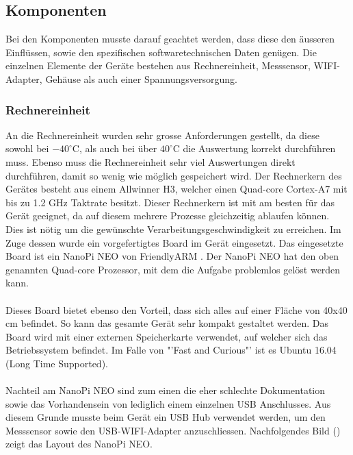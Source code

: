 \subsection{Komponenten}
Bei den Komponenten musste darauf geachtet werden, dass diese den äusseren Einflüssen, sowie den spezifischen softwaretechnischen Daten genügen. Die einzelnen Elemente der Geräte bestehen aus Rechnereinheit, Messsensor, WIFI-Adapter, Gehäuse als auch einer Spannungsversorgung.

\subsubsection{Rechnereinheit}
An die Rechnereinheit wurden sehr grosse Anforderungen gestellt, da diese sowohl bei $-40^\circ\text{C}$, als auch bei über $40^\circ\text{C}$ die Auswertung korrekt durchführen muss. Ebenso muss die Rechnereinheit sehr viel Auswertungen direkt durchführen, damit so wenig wie möglich gespeichert wird. Der Rechnerkern des Gerätes besteht aus einem Allwinner H3, welcher einen Quad-core Cortex-A7 mit bis zu 1.2 GHz Taktrate besitzt. Dieser Rechnerkern ist mit am besten für das Gerät geeignet, da auf diesem mehrere Prozesse gleichzeitig ablaufen können. Dies ist nötig um die gewünschte Verarbeitungsgeschwindigkeit zu erreichen. Im Zuge dessen wurde ein vorgefertigtes Board im Gerät eingesetzt. Das eingesetzte Board ist ein NanoPi NEO von FriendlyARM \cite{NanoPi}. Der NanoPi NEO hat den oben genannten Quad-core Prozessor, mit dem die Aufgabe problemlos gelöst werden kann. \\\\
Dieses Board bietet ebenso den Vorteil, dass sich alles auf einer Fläche von 40x40 cm befindet. So kann das gesamte Gerät sehr kompakt gestaltet werden. Das Board wird mit einer externen Speicherkarte verwendet, auf welcher sich das Betriebssystem befindet. Im Falle von "'Fast and Curious"' ist es Ubuntu 16.04 (Long Time Supported). \\\\
Nachteil am NanoPi NEO sind zum einen die eher schlechte Dokumentation sowie das Vorhandensein von lediglich einem einzelnen USB Anschlusses. Aus diesem Grunde musste beim Gerät ein USB Hub verwendet werden, um den Messsensor sowie den USB-WIFI-Adapter anzuschliessen. Nachfolgendes Bild () zeigt das Layout des NanoPi NEO.

